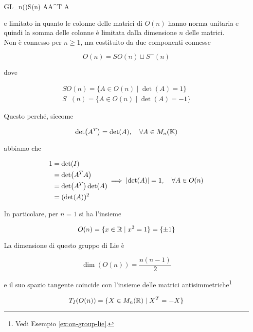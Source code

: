 	{GL_{n}(\R)}{S(n)}
	{A}{A^{T} A}
	
e limitato in quanto le colonne delle matrici di $ O(n) $ hanno norma unitaria e quindi la somma delle colonne è limitata dalla dimensione $ n $ delle matrici.\\
Non è connesso per $ n \geqslant 1 $, ma costituito da due componenti connesse

\begin{equation}
	O(n) = SO(n) \sqcup S^{-}(n)
\end{equation}

dove

\begin{gather}
	SO(n) = \{ A \in O(n) \mid \det(A) = 1 \} \\
	S^{-}(n) = \{ A \in O(n) \mid \det(A) = -1 \}
\end{gather}

Questo perché, siccome

\begin{equation}
	\det(A^{T}) = \det(A) \qcomma \forall A \in M_{n}(\K)
\end{equation}

abbiamo che

\begin{equation}
	\begin{aligned}
		1 &= \det(I) \\
		&= \det(A^{T} A) \\
		&= \det(A^{T}) \det(A) \\
		&= (\det(A))^{2} \\
	\end{aligned} %
	\implies %
	\abs{\det(A)} = 1 \qcomma \forall A \in O(n)
\end{equation}

In particolare, per $ n=1 $ si ha l'insieme

\begin{equation}
	O(n) = \{ x \in \mathbb{R} \mid x^{2} = 1 \} = \{ \pm 1 \}
\end{equation}

La dimensione di questo gruppo di Lie è

\begin{equation}
	\dim(O(n)) = \dfrac{n(n-1)}{2}
\end{equation}

e il suo spazio tangente coincide con l'insieme delle matrici antisimmetriche\footnote{%
	Vedi Esempio \ref{ex:on-group-lie}.%
}

\begin{equation}
	T_{I}(O(n)) = \{ X \in M_{n}(\mathbb{R}) \mid X^{T} = -X \}
\end{equation}

